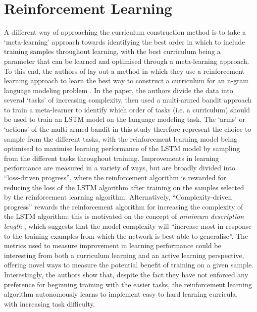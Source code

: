 \section{Reinforcement Learning}
A different way of approaching the curriculum construction method is to take a `meta-learning' \cite{vilalta2002perspective} approach towards identifying the best order in which to include training samples throughout learning, with the best curriculum being a parameter that can be learned and optimised through a meta-learning approach. To this end, the authors of \cite{graves2017automated} lay out a method in which they use a reinforcement learning \cite{sutton1998introduction} approach to learn the best way to construct a curriculum for an n-gram language modeling problem \cite{kneser1995improved}. In the paper, the authors divide the data into several `tasks' of increasing complexity, then used a multi-armed bandit approach \cite{sutton1998introduction} to train a meta-learner to identify which order of tasks (i.e. a curriculum) should be used to train an LSTM model on the language modeling task. The `arms' or `actions' of the multi-armed bandit in this study therefore represent the choice to sample from the different tasks, with the reinforcement learning model being optimised to maximise learning performance of the LSTM model by sampling from the different tasks throughout training. Improvements in learning performance are measured in a variety of ways, but are broadly divided into ``loss-driven progress'', where the reinforcement algorithm is rewarded for reducing the loss of the LSTM algorithm after training on the samples selected by the reinforcement learning algorithm. Alternatively, ``Complexity-driven progress'' rewards the reinforcement algorithm for increasing the complexity of the LSTM algorithm; this is motivated on the concept of \textit{minimum description length} \cite{grunwaldminimum}, which suggests that the model complexity will ``increase most in response to the training examples from which the network is best able to generalise''. The metrics used to measure improvement in learning performance could be interesting from both a curriculum learning and an active learning perspective, offering novel ways to measure the potential benefit of training on a given sample. Interestingly, the authors show that, despite the fact they have not enforced any preference for beginning training with the easier tasks, the reinforcement learning algorithm autonomously learns to implement easy to hard learning curricula, with increasing task difficulty. 

